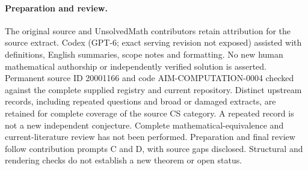 \documentclass[11pt]{article}
\begin{document}
\paragraph{Preparation and review.}
The original source and UnsolvedMath contributors retain attribution for the source extract. Codex (GPT-6; exact serving revision not exposed) assisted with definitions, English summaries, scope notes and formatting. No new human mathematical authorship or independently verified solution is asserted. Permanent source ID 20001166 and code AIM-COMPUTATION-0004 checked against the complete supplied registry and current repository. Distinct upstream records, including repeated questions and broad or damaged extracts, are retained for complete coverage of the source CS category. A repeated record is not a new independent conjecture. Complete mathematical-equivalence and current-literature review has not been performed. Preparation and final review follow contribution prompts C and D, with source gaps disclosed. Structural and rendering checks do not establish a new theorem or open status.
\label{end:20001166}
\end{document}
